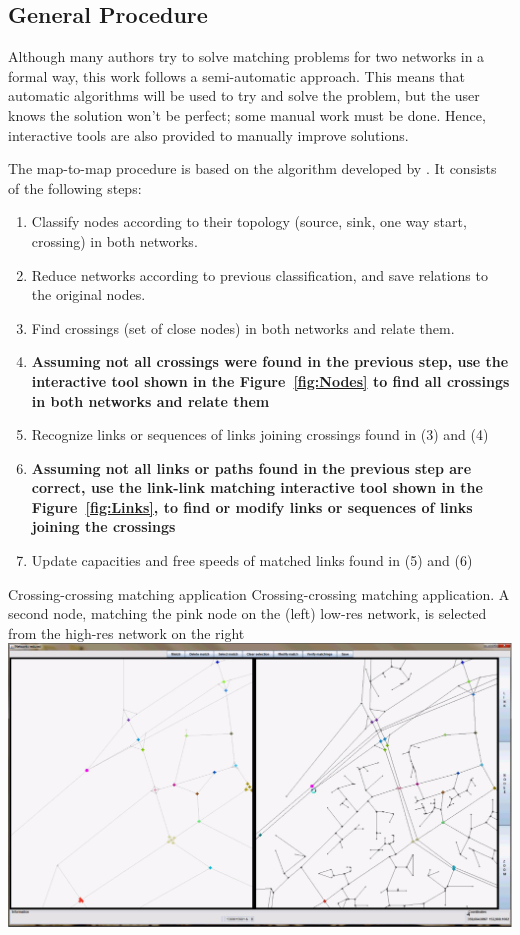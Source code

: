 \subsection{General Procedure}
Although many authors try to solve matching problems for two networks in a formal way, this work follows a semi-automatic approach. This means that automatic algorithms will be used to try and solve the problem, but the user knows the solution won't be perfect;  some manual work must be done. Hence, interactive tools are also provided to manually improve solutions.

The map-to-map procedure is based on the algorithm developed by \citet{BalmerEtAl_STRC_2005}. It consists of the following steps:
%
\begin{enumerate}\styleEnumerate
\item Classify nodes according to their topology (\eg source, sink, one way start, crossing) in both networks.
\item Reduce networks according to previous classification, and save relations to the original nodes.
\item Find crossings (set of close nodes) in both networks and relate them.
\item \textbf{Assuming not all crossings were found in the previous step, use the interactive tool shown in the Figure~\ref{fig:Nodes} to find all crossings in both networks and relate them}
\item Recognize links or sequences of links joining crossings found in (3) and (4)
\item \textbf{Assuming not all links or paths found in the previous step are correct, use the link-link matching interactive tool shown in the Figure~\ref{fig:Links}, to find or modify links or sequences of links joining the crossings}
\item Update capacities and free speeds of matched links found in (5) and (6)
\end{enumerate}
%
\createfigure
{Crossing-crossing matching application}
{Crossing-crossing matching application. A second node, matching the pink node on the (left) low-res network, is selected from the high-res network on the right}
{\label{fig:Nodes}}
{\includegraphics[width=1.0\textwidth]{extending/figures/netEdSing/Nodes.png}}
{}

